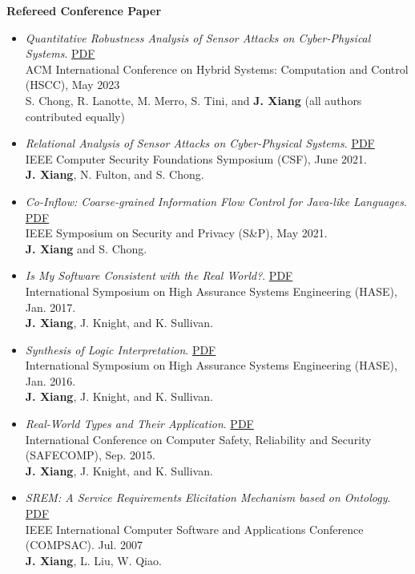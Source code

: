 \documentclass[11pt]{article}
\begin{document}
\textbf{Refereed Conference Paper}

\begin{itemize}

  \item \textit{Quantitative Robustness Analysis of Sensor Attacks on Cyber-Physical Systems}.
  \href{https://www.jianxiang.info/pub/HSCC23.pdf}{PDF} \\
  ACM International Conference on Hybrid Systems: Computation and Control (HSCC), May 2023 \\
  S. Chong, R. Lanotte, M. Merro, S. Tini, and \textbf{J. Xiang}
  (all authors contributed equally)
\item \textit{Relational Analysis of Sensor Attacks on Cyber-Physical Systems}.  \href{https://www.jianxiang.info/pub/CSF21.pdf}{PDF} \\
  IEEE Computer Security Foundations Symposium (CSF),  June 2021. \\
  \textbf{J. Xiang}, N. Fulton, and S. Chong. 
  
\item \textit{Co-Inflow: Coarse-grained Information Flow Control for Java-like Languages}. \href{https://www.jianxiang.info/pub/SP21.pdf}{PDF} \\
  IEEE Symposium on Security and Privacy (S\&P), May 2021.  \\
  \textbf{J. Xiang} and S. Chong.
  
\item \textit{Is My Software Consistent with the Real World?}. \href{https://www.jianxiang.info/pub/HASE17.pdf}{PDF} \\
  International Symposium on High Assurance Systems Engineering (HASE), Jan. 2017.  \\
  \textbf{J. Xiang}, J. Knight, and K. Sullivan.

\item \textit{Synthesis of Logic Interpretation}. \href{https://www.jianxiang.info/pub/HASE16.pdf}{PDF}  \\
  International Symposium on High Assurance Systems Engineering (HASE), Jan. 2016. \\
  \textbf{J. Xiang}, J. Knight, and K. Sullivan.
  
\item \textit{Real-World Types and Their Application}. \href{https://www.jianxiang.info/pub/safecomp15.pdf}{PDF} \\
  International Conference on Computer Safety, Reliability and Security (SAFECOMP), Sep. 2015. \\
  \textbf{J. Xiang}, J. Knight, and K. Sullivan.
  
\item \textit{SREM: A Service Requirements Elicitation Mechanism based on Ontology}. \href{https://www.jianxiang.info/pub/compsac07.pdf}{PDF} \\
  IEEE International Computer Software and Applications Conference (COMPSAC). Jul. 2007 \\
  \textbf{J. Xiang}, L. Liu, W. Qiao.  
\end{itemize}
    
\end{document}

